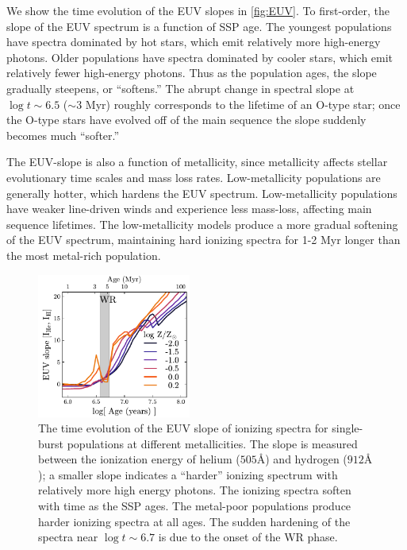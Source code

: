 \documentclass[linenumbers, tighten, trackchanges]{aastex61}%
\newcommand{\Fig}[1]{\autoref{fig:#1}}
\newcommand{\ang}{\ensuremath{\mbox{\AA}}}
\begin{document}
We show the time evolution of the EUV slopes in \Fig{EUV}. To first-order, the slope of the EUV spectrum is a function of SSP age. The youngest populations have spectra dominated by hot stars, which emit relatively more high-energy photons. Older populations have spectra dominated by cooler stars, which emit relatively fewer high-energy photons. Thus as the population ages, the slope gradually steepens, or ``softens.'' The abrupt change in spectral slope at $\log t \sim 6.5$ ($\sim 3$ Myr) roughly corresponds to the lifetime of an O-type star; once the O-type stars have evolved off of the main sequence the slope suddenly becomes much ``softer.''

The EUV-slope is also a function of metallicity, since metallicity affects stellar evolutionary time scales and mass loss rates. Low-metallicity populations are generally hotter, which hardens the EUV spectrum. Low-metallicity populations have weaker line-driven winds and experience less mass-loss, affecting main sequence lifetimes. The low-metallicity models produce a more gradual softening of the EUV spectrum, maintaining hard ionizing spectra for 1-2 Myr longer than the most metal-rich population. 
\begin{figure}[!htbp]
  \begin{centering}
    \includegraphics[width=0.45\textwidth]{f3.pdf}
    \caption{The time evolution of the EUV slope of ionizing spectra for single-burst populations at different metallicities. The slope is measured between the ionization energy of helium ($505\ang$) and hydrogen ($912\ang$); a smaller slope indicates a ``harder'' ionizing spectrum with relatively more high energy photons. The ionizing spectra soften with time as the SSP ages. The metal-poor populations produce harder ionizing spectra at all ages. The sudden hardening of the spectra near $\log t \sim 6.7$ is due to the onset of the WR phase.}
    \label{fig:EUV}
  \end{centering}
\end{figure}
\end{document}
